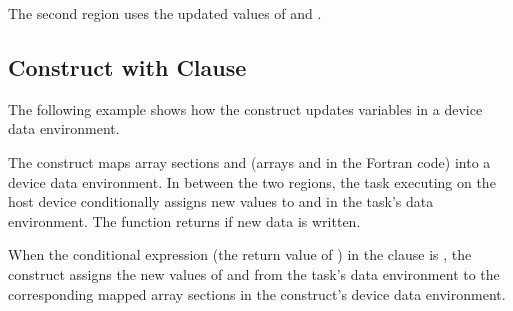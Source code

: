 The second  region uses the updated values of  and .



\subsection{  Construct with  Clause}
\label{subsec:target_update_if}

The following example shows how the   construct updates 
variables in a device data environment.

The   construct maps array sections  and  
(arrays  and  in the Fortran code) into a device data environment. In between 
the two  regions, the task executing on the host device conditionally 
assigns new values to  and  in the task's data environment. The function  
returns  if new data is written.

When the conditional expression (the return value of ) in the 
 clause is , the   construct 
assigns the new values of  and  from the task's data environment to the corresponding 
mapped array sections in the   construct's device data 
environment.



